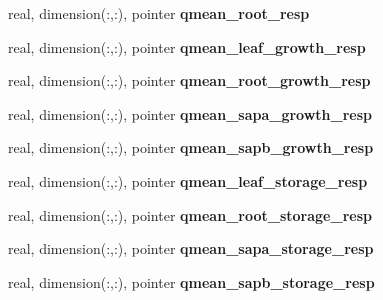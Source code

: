 \begin{DoxyCompactItemize}
\item 
\hypertarget{structed__state__vars_1_1edtype_a36efc0ff857a55694e44515a0187cad0}{
real, dimension(:,:), pointer {\bfseries qmean\_\-root\_\-resp}}
\label{structed__state__vars_1_1edtype_a36efc0ff857a55694e44515a0187cad0}

\item 
\hypertarget{structed__state__vars_1_1edtype_a71ae90fc844c8f68c49b188c48eddeaf}{
real, dimension(:,:), pointer {\bfseries qmean\_\-leaf\_\-growth\_\-resp}}
\label{structed__state__vars_1_1edtype_a71ae90fc844c8f68c49b188c48eddeaf}

\item 
\hypertarget{structed__state__vars_1_1edtype_a7293a2374ef991ae032fda5311ba8667}{
real, dimension(:,:), pointer {\bfseries qmean\_\-root\_\-growth\_\-resp}}
\label{structed__state__vars_1_1edtype_a7293a2374ef991ae032fda5311ba8667}

\item 
\hypertarget{structed__state__vars_1_1edtype_aa3ee22588a63003d1021cf1cd81289cc}{
real, dimension(:,:), pointer {\bfseries qmean\_\-sapa\_\-growth\_\-resp}}
\label{structed__state__vars_1_1edtype_aa3ee22588a63003d1021cf1cd81289cc}

\item 
\hypertarget{structed__state__vars_1_1edtype_adeb98446f979a5980458e1d7327cfb53}{
real, dimension(:,:), pointer {\bfseries qmean\_\-sapb\_\-growth\_\-resp}}
\label{structed__state__vars_1_1edtype_adeb98446f979a5980458e1d7327cfb53}

\item 
\hypertarget{structed__state__vars_1_1edtype_a45d2fc881d6afdee487fa8f28db33453}{
real, dimension(:,:), pointer {\bfseries qmean\_\-leaf\_\-storage\_\-resp}}
\label{structed__state__vars_1_1edtype_a45d2fc881d6afdee487fa8f28db33453}

\item 
\hypertarget{structed__state__vars_1_1edtype_a72a8f4ba444e084978a0bab723aca9a6}{
real, dimension(:,:), pointer {\bfseries qmean\_\-root\_\-storage\_\-resp}}
\label{structed__state__vars_1_1edtype_a72a8f4ba444e084978a0bab723aca9a6}

\item 
\hypertarget{structed__state__vars_1_1edtype_a8f0236b8e03a1055401171aa86c3952b}{
real, dimension(:,:), pointer {\bfseries qmean\_\-sapa\_\-storage\_\-resp}}
\label{structed__state__vars_1_1edtype_a8f0236b8e03a1055401171aa86c3952b}

\item 
\hypertarget{structed__state__vars_1_1edtype_ac7403e28eb56c21628a248139d51d760}{
real, dimension(:,:), pointer {\bfseries qmean\_\-sapb\_\-storage\_\-resp}}
\label{structed__state__vars_1_1edtype_ac7403e28eb56c21628a248139d51d760}


\end{DoxyCompactItemize}
